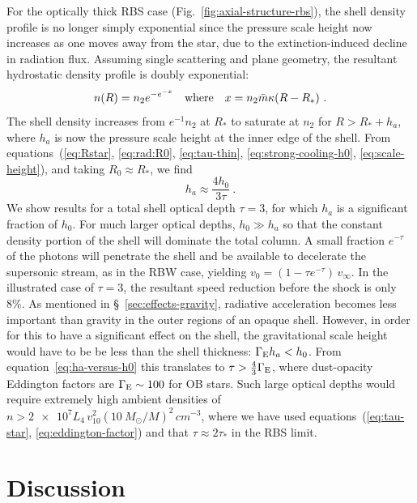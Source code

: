 For the optically thick RBS case (Fig.~\ref{fig:axial-structure-rbs}),
the shell density profile is no longer simply exponential since the
pressure scale height now increases as one moves away from the star,
due to the extinction-induced decline in radiation flux. Assuming
single scattering and plane geometry, the resultant hydrostatic
density profile is doubly exponential:
\begin{equation}
  \label{eq:rbs-density-profile}
  n(R) = n_2 e^{-e^{-x}} \text{\quad where\quad } x = n_2 \bar{m} \kappa (R - R_*) \ . 
\end{equation}
The shell density increases from \(e^{-1} n_2\) at \(R_*\) to saturate
at \(n_2\) for \(R > R_* + h_a\), where \(h_a\) is now the pressure
scale height at the inner edge of the shell.  From
equations~(\ref{eq:Rstar}, \ref{eq:rad:R0}, \ref{eq:tau-thin},
\ref{eq:strong-cooling-h0}, \ref{eq:scale-height}), and taking
\(R_0 \approx R_*\), we find
\begin{equation}
  \label{eq:ha-versus-h0}
  h_a \approx \frac{4 h_0}{3 \tau} \ .
\end{equation}
We show results for a total shell optical depth \(\tau = 3\), for which
\(h_a\) is a significant fraction of \(h_0\).  For much larger optical
depths, \(h_0 \gg h_a\) so that the constant density portion of the
shell will dominate the total column.  A small fraction \(e^{-\tau}\) of
the photons will penetrate the shell and be available to decelerate
the supersonic stream, as in the RBW case, yielding
\(v_0 = (1 - \tau e^{-\tau})\, v_\infty\).  In the illustrated case of
\(\tau = 3\), the resultant speed reduction before the shock is only 8\%.
As mentioned in \S~\ref{sec:effects-gravity}, radiative acceleration
becomes less important than gravity in the outer regions of an opaque
shell.  However, in order for this to have a significant effect on the
shell, the gravitational scale height would have to be be less than
the shell thickness: \(\Gamma_{\text{E}} h_a < h_0\).  From
equation~\eqref{eq:ha-versus-h0} this translates to
\(\tau > \frac43 \Gamma_{\text{E}}\), where dust-opacity Eddington factors are
\(\Gamma_{\text{E}} \sim 100\) for OB stars.  Such large optical depths would
require extremely high ambient densities of
\(n > \num{2e7} L_4 \,v_{10}^2 \left( \SI{10}{M_\odot}/M \right)^2 \,
\si{cm^{-3}} \), where we have used equations~(\ref{eq:tau-star},
\ref{eq:eddington-factor}) and that \(\tau \approx 2\tau_*\) in the RBS limit.

\section{Discussion}
\label{sec:discussion}

